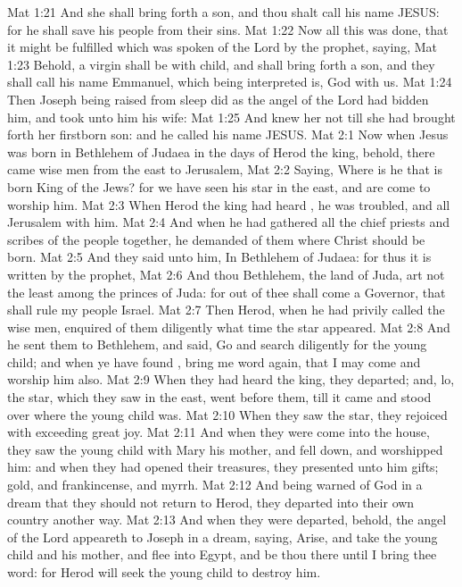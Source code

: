 \vs Mat 1:21 And she shall bring forth a son, and thou shalt call his name JESUS: for he shall save his people from their sins.
\vs Mat 1:22 Now all this was done, that it might be fulfilled which was spoken of the Lord by the prophet, saying,
\vs Mat 1:23 Behold, a virgin shall be with child, and shall bring forth a son, and they shall call his name Emmanuel, which being interpreted is, God with us.
\vs Mat 1:24 Then Joseph being raised from sleep did as the angel of the Lord had bidden him, and took unto him his wife:
\vs Mat 1:25 And knew her not till she had brought forth her firstborn son: and he called his name JESUS.
\vs Mat 2:1 Now when Jesus was born in Bethlehem of Judaea in the days of Herod the king, behold, there came wise men from the east to Jerusalem,
\vs Mat 2:2 Saying, Where is he that is born King of the Jews? for we have seen his star in the east, and are come to worship him.
\vs Mat 2:3 When Herod the king had heard , he was troubled, and all Jerusalem with him.
\vs Mat 2:4 And when he had gathered all the chief priests and scribes of the people together, he demanded of them where Christ should be born.
\vs Mat 2:5 And they said unto him, In Bethlehem of Judaea: for thus it is written by the prophet,
\vs Mat 2:6 And thou Bethlehem,  the land of Juda, art not the least among the princes of Juda: for out of thee shall come a Governor, that shall rule my people Israel.
\vs Mat 2:7 Then Herod, when he had privily called the wise men, enquired of them diligently what time the star appeared.
\vs Mat 2:8 And he sent them to Bethlehem, and said, Go and search diligently for the young child; and when ye have found , bring me word again, that I may come and worship him also.
\vs Mat 2:9 When they had heard the king, they departed; and, lo, the star, which they saw in the east, went before them, till it came and stood over where the young child was.
\vs Mat 2:10 When they saw the star, they rejoiced with exceeding great joy.
\vs Mat 2:11 And when they were come into the house, they saw the young child with Mary his mother, and fell down, and worshipped him: and when they had opened their treasures, they presented unto him gifts; gold, and frankincense, and myrrh.
\vs Mat 2:12 And being warned of God in a dream that they should not return to Herod, they departed into their own country another way.
\vs Mat 2:13 And when they were departed, behold, the angel of the Lord appeareth to Joseph in a dream, saying, Arise, and take the young child and his mother, and flee into Egypt, and be thou there until I bring thee word: for Herod will seek the young child to destroy him.
